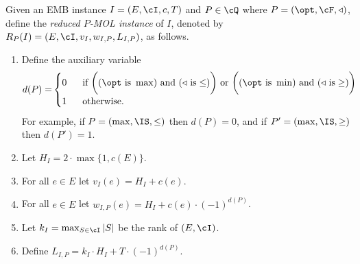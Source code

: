 \begin{definition}
	\label{def:reduction}
	Given an \textnormal{EMB} instance $I =(E,\cI,c,T)$ and  $P \in \cQ$ where $P = (\opt,\cF,\triangleleft)$, define the
	 {\em reduced $P$-MOL instance} of $I$, denoted by  $R_P(I) = (E,\cI,v_I,w_{I,P},L_{I,P})$, as follows.
	\begin{enumerate}
		\item Define the auxiliary variable 
		\begin{align*}
			d(P) = & \begin{cases}
				0 & ~~\textnormal{if  } \bigg((\opt \textnormal{ is } \max)  \textnormal{ and }   (\triangleleft \textnormal{ is}   \leq) \bigg) \textnormal{ or } 
				\bigg((\opt \textnormal{ is } \min)  \textnormal{ and }   (\triangleleft \textnormal{ is}   \geq) \bigg)\\
				1 & ~~\textnormal{otherwise.}
			\end{cases}
		\end{align*} For example, if $P = (\max,\IS,\leq)$ then $d(P) = 0$, and if  $P' = (\max,\IS,\geq)$ then $d(P') = 1$. 
		\item Let $H_I = 2 \cdot \max \{1, c(E)\}$.
		\item For all $e \in E$ let $v_I(e) =  H_I +c(e)$. 
		\item For all $e \in E$ let $w_{I,P}(e) =  H_I +c(e) \cdot (-1)^{d(P)}$.
		\item Let $k_I = \max_{S \in \cI} |S|$ be the rank of $(E,\cI)$. 
		\item Define $L_{I,P} = k_I \cdot H_I +T \cdot  (-1)^{d(P)}$. 
	\end{enumerate}
\end{definition}


